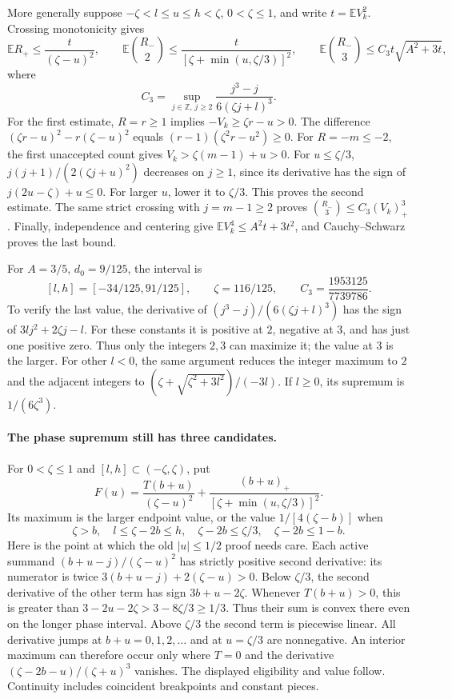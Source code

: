 More generally suppose $-\zeta<l\le u\le h<\zeta$, $0<\zeta\le1$,
and write $t=\mathbb EV_k^2$. Crossing monotonicity gives
\begin{equation}\label{v10:count:crossings}
 \mathbb ER_+\le\frac{t}{(\zeta-u)^2},\qquad
 \mathbb E\binom{R_-}{2}\le\frac{t}{[\zeta+\min(u,\zeta/3)]^2},
 \qquad
 \mathbb E\binom{R_-}{3}\le C_3t\sqrt{A^2+3t},
\end{equation}
where
\[
 C_3=\sup_{j\in\mathbb Z,\,j\ge2}
                  \frac{j^3-j}{6(\zeta j+l)^3}.
\]
For the first estimate, $R=r\ge1$ implies $-V_k\ge\zeta r-u>0$.
The difference $(\zeta r-u)^2-r(\zeta-u)^2$ equals
$(r-1)(\zeta^2r-u^2)\ge0$. For $R=-m\le-2$, the first unaccepted count
gives $V_k>\zeta(m-1)+u>0$. For $u\le\zeta/3$,
$j(j+1)/(2(\zeta j+u)^2)$ decreases on $j\ge1$, since its derivative
has the sign of $j(2u-\zeta)+u\le0$. For larger $u$, lower it to
$\zeta/3$. This proves the second estimate. The same strict crossing
with $j=m-1\ge2$ proves $\binom{R_-}{3}\le C_3(V_k)_+^3$.
Finally, independence and centering give
$\mathbb EV_k^4\le A^2t+3t^2$, and Cauchy--Schwarz proves the last bound.

For $A=3/5$, $d_0=9/125$, the interval is
\begin{equation}\label{v10:count:constants}
 [l,h]=[-34/125,91/125],\qquad \zeta=116/125,
 \qquad C_3=\frac{1953125}{7739786}.
\end{equation}
To verify the last value, the derivative of
$(j^3-j)/(6(\zeta j+l)^3)$ has the sign of
$3lj^2+2\zeta j-l$. For these constants it is positive at $2$,
negative at $3$, and has just one positive zero. Thus only the integers
$2,3$ can maximize it; the value at $3$ is the larger. For other $l<0$,
the same argument reduces the integer maximum to $2$ and the adjacent
integers to $(\zeta+\sqrt{\zeta^2+3l^2})/(-3l)$. If $l\ge0$, its
supremum is $1/(6\zeta^3)$.

\paragraph{The phase supremum still has three candidates.}
For $0<\zeta\le1$ and $[l,h]\subset(-\zeta,\zeta)$, put
\[
 F(u)=\frac{T(b+u)}{(\zeta-u)^2}
       +\frac{(b+u)_+}{[\zeta+\min(u,\zeta/3)]^2}.
\]
Its maximum is the larger endpoint value, or the value
$1/[4(\zeta-b)]$ when
\[
 \zeta>b,\quad l\le\zeta-2b\le h,\quad
 \zeta-2b\le\zeta/3,\quad\zeta-2b\le1-b.
\]
Here is the point at which the old $|u|\le1/2$ proof needs care.
Each active summand $(b+u-j)/(\zeta-u)^2$ has strictly positive second
derivative: its numerator is twice
$3(b+u-j)+2(\zeta-u)>0$. Below $\zeta/3$, the second derivative of the
other term has sign $3b+u-2\zeta$. Whenever $T(b+u)>0$, this is greater
than $3-2u-2\zeta>3-8\zeta/3\ge1/3$. Thus their sum is convex there
even on the longer phase interval. Above $\zeta/3$ the second term is
piecewise linear. All derivative jumps at $b+u=0,1,2,\ldots$ and at
$u=\zeta/3$ are nonnegative. An interior maximum can therefore occur
only where $T=0$ and the derivative
$(\zeta-2b-u)/(\zeta+u)^3$ vanishes. The displayed eligibility and value
follow. Continuity includes coincident breakpoints and constant pieces.

